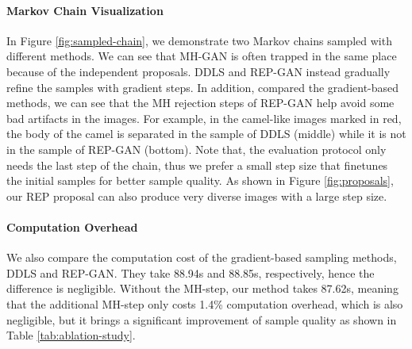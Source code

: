 \documentclass[runningheads]{llncs}
\newcommand{\<}{\left\langle}
\renewcommand{\>}{\right\rangle}
\begin{document}
\paragraph{\textbf{Markov Chain Visualization}} In Figure \ref{fig:sampled-chain}, we demonstrate two Markov chains sampled with different methods.  We can see that 
MH-GAN is often trapped in the same place because of the independent proposals. DDLS and REP-GAN instead gradually refine the samples with gradient steps. In addition, compared the gradient-based methods, we can see that the MH rejection steps of REP-GAN help avoid some bad artifacts in the images. For example, in the camel-like images marked in red, the body of the camel is separated in the sample of DDLS (middle) while it is not in the sample of REP-GAN (bottom). 
Note that, the evaluation protocol only needs the last step of the chain, thus we prefer a small step size that finetunes the initial samples for better sample quality. As shown in Figure \ref{fig:proposals}, our REP proposal can also produce very diverse images with a large step size. 




\paragraph{\textbf{Computation Overhead}} We also compare the computation cost of the gradient-based sampling methods, DDLS and REP-GAN. They take 88.94s and 88.85s, respectively, hence the difference is negligible. Without the MH-step, our method takes 87.62s, meaning that the additional MH-step only costs 1.4\% computation overhead, which is also negligible, but it brings a significant improvement of sample quality as shown in Table \ref{tab:ablation-study}. 
\end{document}
